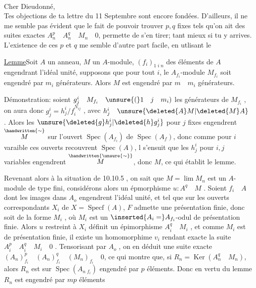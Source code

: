 \\

Cher Dieudonné,\\

Tes objections de ta lettre du 11 Septembre sont encore fondées. D'ailleurs, il ne me semble pas évident que le fait de pouvoir trouver $p,q$ fixes tels qu'on ait des suites exactes $A_n^p\quad A_n^q\quad M_n\quad0$, permette de s'en tirer; tant mieux si tu y arrives. L'existence de ces $p$ et $q$ me semble d'autre part facile, en utlisant le

\uline{Lemme}\quad Soit $A$ un anneau, $M$ un $A$-module, $(f_i)_{1\;i\;n}$ des éléments de $A$ engendrant l'idéal unité,  supposons que pour tout $i$, le $A_{f_i}$-module $M_{f_i}$ soit engendré par $m_i$ générateurs. Alors $M$ est engendré par $m\quad m_i$ générateurs.

Démonstration: soient $g_j^i\quad M_{f_i}\quad\unsure{(}1\quad j\quad m_i)$ les générateurs de $M_{f_i}$ , on aura donc $g_j^i=h_j^i/f_i^{N_{ij}}$ , avec $h_j^i\quad \unsure{\deleted{A}M|\deleted{M}A}$ . Alors les $\unsure{\deleted{g}h_j^i|\deleted{h}g_j^i}$ pour $j$ fixes engendrent $\overset{\handwritten{\sim}}{M}$ sur l'ouvert $\operatorname{Spec}(A_{f_i})$ de $\operatorname{Spec}(A_f)$, donc comme pour $i$ varaible ces ouverts recouvrent $\operatorname{Spec}(A)$, l s'ensuit que les $h_j^i$ pour $i,j$ variables engendrent $\overset{\handwritten{\unsure{\sim}}}{M}$, donc $M$, ce qui établit le lemme.

Revenant alors à la situation de 10.10.5 , on sait que $M=\lim M_n$ est un $A$-module de type fini, considérons alors un épmorphisme $u:A^q\quad M$ . Soient $f_i\quad A$ dont les images dans $A_o$ engendrent l'idéal unité, et tel que sur les  ouverts correspondants $X_i$ de $X=\operatorname{Specf}(A)$, $F$ admette une présentation finie, donc soit de la forme $M_i$ , où $M_i$ est un $\inserted{A_i=}A_{f_i}$-odul de présentation finie. Alors $u$ restreint à $X_i$ définit un épimorphisme $A_i^q\quad M_i$ , et comme $M_i$ est de présentation finie, il existe un homomorphime $v_i$ rendant exacte la suite $A_i^p\quad A_i^q\quad M_i\quad0$ . Tensorisant par $A_o$ , on en déduit une suite exacte $(A_n)_{f_i}^p\quad(A_n)_{f_i}^q\quad(M_n)_{f_i}\quad0$, ce qui montre que, si $R_n=\operatorname{Ker}(A_n^q\quad M_n)$, alors $R_n$ est sur $\operatorname{Spec}(A_{n\;f_i})$ engendré par $p$ éléments. Donc en vertu du lemme $R_n$ est engendré par $mp$ éléments

